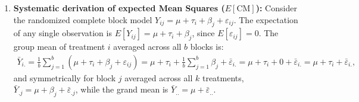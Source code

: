 \begin{solproblema}
	\begin{enumerate}
		\item \textbf{Systematic derivation of expected Mean Squares ($E[\text{CM}]$):}
		Consider the randomized complete block model $Y_{ij} = \mu + \tau_i + \beta_j + \varepsilon_{ij}$.
		The expectation of any single observation is $E[Y_{ij}] = \mu + \tau_i + \beta_j$, since $E[\varepsilon_{ij}] = 0$.
		The group mean of treatment $i$ averaged across all $b$ blocks is:
		\begin{align}
			\bar{Y}_{i.} = \frac{1}{b}\sum_{j=1}^b (\mu + \tau_i + \beta_j + \varepsilon_{ij}) = \mu + \tau_i + \frac{1}{b}\sum_{j=1}^b \beta_j + \bar{\varepsilon}_{i.} = \mu + \tau_i + 0 + \bar{\varepsilon}_{i.} = \mu + \tau_i + \bar{\varepsilon}_{i.},
		\end{align}
		and symmetrically for block $j$ averaged across all $k$ treatments, $\bar{Y}_{.j} = \mu + \beta_j + \bar{\varepsilon}_{.j}$, while the grand mean is $\bar{Y}_{..} = \mu + \bar{\varepsilon}_{..}$.
		

\end{enumerate}
\end{solproblema}
